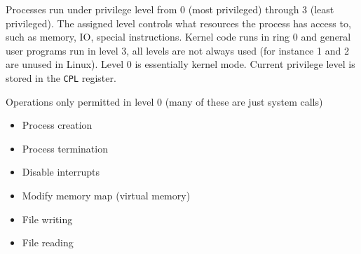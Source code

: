 
Processes run under privilege level from 0 (most privileged) through 3 (least privileged). The assigned level controls what resources the process has access to, such as memory, IO, special instructions. Kernel code runs in ring 0 and general user programs run in level 3, all levels are not always used (for instance 1 and 2 are unused in Linux). Level 0 is essentially kernel mode. Current privilege level is stored in the \texttt{CPL} register.

Operations only permitted in level 0 (many of these are just system calls)
\begin{itemize}
\item Process creation
\item Process termination
\item Disable interrupts
\item Modify memory map (virtual memory)
\item File writing
\item File reading
\end{itemize}
